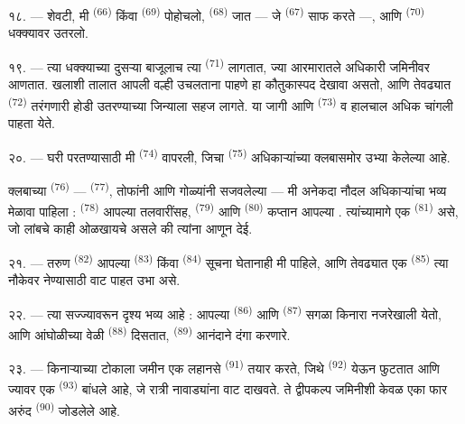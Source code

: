 १८. --- शेवटी, मी  \textsuperscript{(66)} किंवा 
\textsuperscript{(69)} पोहोचलो,  \textsuperscript{(68)} जात
— जे  \textsuperscript{(67)} साफ करते —, आणि 
\textsuperscript{(70)} धक्क्यावर उतरलो.

१९. --- त्या धक्क्याच्या दुसऱ्या बाजूलाच त्या  \textsuperscript{(71)} लागतात,
ज्या आरमारातले अधिकारी जमिनीवर आणतात. खलाशी तालात आपली वल्ही उचलताना पाहणे हा कौतुकास्पद
देखावा असतो, आणि तेवढ्यात  \textsuperscript{(72)} तरंगणारी होडी उतरण्याच्या
जिन्याला सहज लागते. या जागी  आणि 
\textsuperscript{(73)}  व  हालचाल अधिक चांगली पाहता येते.

\VUsaut{3.0mm}
\VUsaut{3.0mm}

२०. --- घरी परतण्यासाठी मी  \textsuperscript{(74)} वापरली, जिचा
 \textsuperscript{(75)} अधिकाऱ्यांच्या क्लबासमोर उभ्या केलेल्या
 आहे.

क्लबाच्या  \textsuperscript{(76)} — 
\textsuperscript{(77)}, तोफांनी आणि गोळ्यांनी सजवलेल्या — मी अनेकदा नौदल अधिकाऱ्यांचा भव्य
मेळावा पाहिला :  \textsuperscript{(78)} आपल्या तलवारींसह,
 \textsuperscript{(79)} आणि 
\textsuperscript{(80)} कप्तान आपल्या . त्यांच्यामागे एक 
\textsuperscript{(81)} असे, जो लांबचे काही ओळखायचे असले की त्यांना  आणून देई.

२१. --- तरुण  \textsuperscript{(82)} आपल्या 
\textsuperscript{(83)} किंवा  \textsuperscript{(84)} सूचना घेतानाही मी
पाहिले, आणि तेवढ्यात एक  \textsuperscript{(85)} त्या नौकेवर नेण्यासाठी वाट पाहत
उभा असे.

२२. --- त्या सज्ज्यावरून दृश्य भव्य आहे : आपल्या  \textsuperscript{(86)} आणि
 \textsuperscript{(87)} सगळा किनारा नजरेखाली येतो, आणि
आंघोळीच्या वेळी  \textsuperscript{(88)} दिसतात, 
\textsuperscript{(89)} आनंदाने दंगा करणारे.

२३. --- किनाऱ्याच्या टोकाला जमीन एक लहानसे  
\textsuperscript{(91)} तयार करते, जिथे  \textsuperscript{(92)} येऊन फुटतात
आणि ज्यावर एक  \textsuperscript{(93)} बांधले आहे, जे रात्री नावाड्यांना वाट
दाखवते. ते द्वीपकल्प जमिनीशी केवळ एका फार अरुंद  \textsuperscript{(90)}
जोडलेले आहे.

